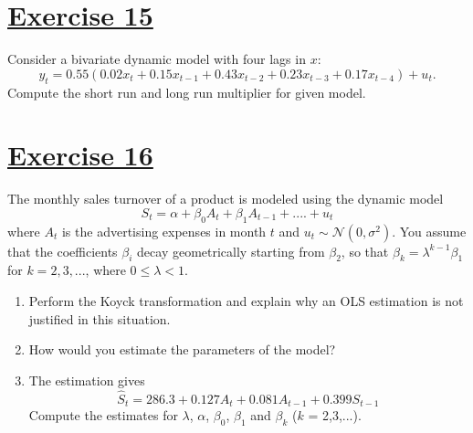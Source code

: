 \documentclass[captions=tableheading, 12pt, headings=small, parskip=half]{scrartcl}
\begin{document}
\section*{\underline{Exercise 15}}
Consider a bivariate dynamic model with four lags in $x$:
\begin{equation*}
y_{t}=0.55\left(
0.02x_{t}+0.15x_{t-1}+0.43x_{t-2}+0.23x_{t-3}+0.17x_{t-4}\right) +u_{t}.
\end{equation*}
Compute the short run and long run multiplier for given model.

\section*{\underline{Exercise 16}}
The monthly sales turnover of a product is modeled using the dynamic model
\[
	S_t = \alpha + \beta_0A_t + \beta_1A_{t-1} + .... + u_t
\]where $A_t$ is the advertising expenses in month $t$ and $u_t\sim\mathcal{N}(0, \sigma^2)$. You assume that the coefficients $\beta_i$ decay geometrically starting from $\beta_2$, so that $\beta_k = \lambda^{k-1}\beta_1$ for $k = 2,3,...$, where $0\le \lambda < 1$.
\begin{enumerate}
	\item Perform the Koyck transformation and explain why an OLS estimation is not justified in this situation.
	\item How would you estimate the parameters of the model?
	\item The estimation gives
	\[
		\hat{S}_t = 286.3 + 0.127A_t + 0.081A_{t-1} + 0.399S_{t-1}
	\]Compute the estimates for $\lambda$, $\alpha$, $\beta_0$, $\beta_1$ and $\beta_k$ ($k$ = 2,3,...).
\end{enumerate}
\end{document}
